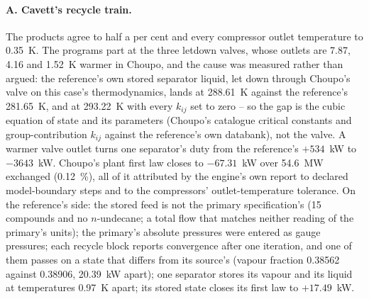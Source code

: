 \documentclass[11pt,a4paper]{article}
\begin{document}
\paragraph{A. Cavett's recycle train.}  The products agree to half a per
cent and every compressor outlet temperature to 0.35~K.  The programs part
at the three letdown valves, whose outlets are 7.87, 4.16 and 1.52~K warmer
in Choupo, and the cause was measured rather than argued: the reference's
own stored separator liquid, let down through Choupo's valve on this case's
thermodynamics, lands at 288.61~K against the reference's 281.65~K, and at
293.22~K with every $k_{ij}$ set to zero -- so the gap is the cubic equation
of state and its parameters (Choupo's catalogue critical constants and
group-contribution $k_{ij}$ against the reference's own databank), not the
valve.  A warmer valve outlet turns one separator's duty from the
reference's $+534$~kW to $-3643$~kW.  Choupo's plant first law closes to
$-67.31$~kW over 54.6~MW exchanged (0.12~\%), all of it attributed by the
engine's own report to declared model-boundary steps and to the
compressors' outlet-temperature tolerance.  On the reference's side: the
stored feed is not the primary specification's (15 compounds and no
$n$-undecane; a total flow that matches neither reading of the primary's
units); the primary's absolute pressures were entered as gauge pressures;
each recycle block reports convergence after one iteration, and one of them
passes on a state that differs from its source's (vapour fraction 0.38562
against 0.38906, 20.39~kW apart); one separator stores its vapour and its
liquid at temperatures 0.97~K apart; its stored state closes its first law
to $+17.49$~kW.
\end{document}
